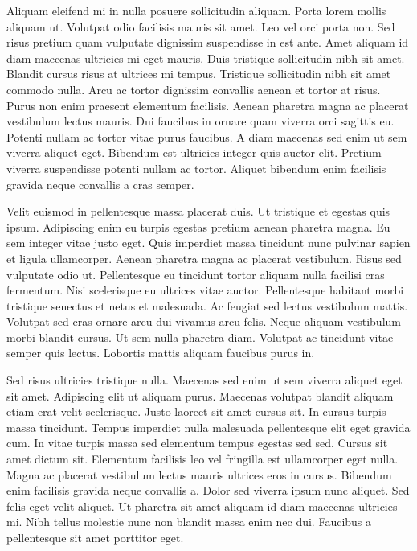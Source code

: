 \documentclass[11pt,a4paper]{article}
\begin{document}
Aliquam eleifend mi in nulla posuere sollicitudin aliquam. Porta lorem mollis aliquam ut. Volutpat odio facilisis mauris sit amet. Leo vel orci porta non. Sed risus pretium quam vulputate dignissim suspendisse in est ante. Amet aliquam id diam maecenas ultricies mi eget mauris. Duis tristique sollicitudin nibh sit amet. Blandit cursus risus at ultrices mi tempus. Tristique sollicitudin nibh sit amet commodo nulla. Arcu ac tortor dignissim convallis aenean et tortor at risus. Purus non enim praesent elementum facilisis. Aenean pharetra magna ac placerat vestibulum lectus mauris. Dui faucibus in ornare quam viverra orci sagittis eu. Potenti nullam ac tortor vitae purus faucibus. A diam maecenas sed enim ut sem viverra aliquet eget. Bibendum est ultricies integer quis auctor elit. Pretium viverra suspendisse potenti nullam ac tortor. Aliquet bibendum enim facilisis gravida neque convallis a cras semper.

Velit euismod in pellentesque massa placerat duis. Ut tristique et egestas quis ipsum. Adipiscing enim eu turpis egestas pretium aenean pharetra magna. Eu sem integer vitae justo eget. Quis imperdiet massa tincidunt nunc pulvinar sapien et ligula ullamcorper. Aenean pharetra magna ac placerat vestibulum. Risus sed vulputate odio ut. Pellentesque eu tincidunt tortor aliquam nulla facilisi cras fermentum. Nisi scelerisque eu ultrices vitae auctor. Pellentesque habitant morbi tristique senectus et netus et malesuada. Ac feugiat sed lectus vestibulum mattis. Volutpat sed cras ornare arcu dui vivamus arcu felis. Neque aliquam vestibulum morbi blandit cursus. Ut sem nulla pharetra diam. Volutpat ac tincidunt vitae semper quis lectus. Lobortis mattis aliquam faucibus purus in.

Sed risus ultricies tristique nulla. Maecenas sed enim ut sem viverra aliquet eget sit amet. Adipiscing elit ut aliquam purus. Maecenas volutpat blandit aliquam etiam erat velit scelerisque. Justo laoreet sit amet cursus sit. In cursus turpis massa tincidunt. Tempus imperdiet nulla malesuada pellentesque elit eget gravida cum. In vitae turpis massa sed elementum tempus egestas sed sed. Cursus sit amet dictum sit. Elementum facilisis leo vel fringilla est ullamcorper eget nulla. Magna ac placerat vestibulum lectus mauris ultrices eros in cursus. Bibendum enim facilisis gravida neque convallis a. Dolor sed viverra ipsum nunc aliquet. Sed felis eget velit aliquet. Ut pharetra sit amet aliquam id diam maecenas ultricies mi. Nibh tellus molestie nunc non blandit massa enim nec dui. Faucibus a pellentesque sit amet porttitor eget.
\end{document}
